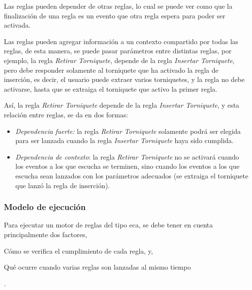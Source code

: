 
Las reglas pueden depender de otras reglas, lo cual se puede ver como que la
finalización de una regla es un evento que otra regla espera para poder ser
activada.

Las reglas pueden agregar información a un contexto compartido por todas las
reglas, de esta manera, se puede pasar parámetros entre distintas reglas, por
ejemplo, la regla \emph{Retirar Torniquete}, depende de la regla \emph{Insertar
Torniquete}, pero debe responder solamente al torniquete que ha activado
la regla de inserción, es decir, el usuario puede extraer varios torniquetes, y
la regla no debe activarse, hasta que se extraiga el torniquete que activo la
primer regla.

Así, la regla \emph{Retirar Torniquete} depende de la regla \emph{Insertar
Torniquete}, y esta relación entre reglas, se da en dos
formas\cite{bailey2004event}:


\begin{itemize}
\item  \emph{Dependencia fuerte:} la regla \emph{Retirar Torniquete} solamente podrá
	ser elegida para ser lanzada cuando la regla \emph{Insertar Torniquete}
	haya sido cumplida.
\item  \emph{Dependencia de contexto}: la regla \emph{Retirar Torniquete} no se
	activará cuando los eventos a los que escucha se terminen, sino cuando
	los eventos a los que escucha sean lanzados con los parámetros adecuados
	(se extraiga el torniquete que lanzó la regla de inserción).
\end{itemize}

\subsubsection{Modelo de ejecución}
\label{sec:eca_ejecucion}

Para ejecutar un motor de reglas del tipo \gls{eca}, se debe tener en cuenta
principalmente dos factores, 
\begin{enumerate*}[label=\itshape\alph*\upshape)]
\item  Cómo se verifica el cumplimiento de cada regla, y, 
\item  Qué ocurre cuando varias reglas son lanzadas al mismo tiempo
\end{enumerate*}.

